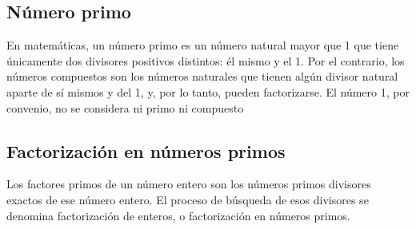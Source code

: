 \subsection{Número primo}
En matemáticas, un número primo es un número natural mayor que 1 que tiene únicamente
dos divisores positivos distintos: él mismo y el 1. Por el contrario, los números compuestos son
los números naturales que tienen algún divisor natural aparte de sí mismos y del 1, y, por lo tanto, pueden factorizarse. El número 1, por convenio, no se considera ni primo ni compuesto

\subsection{Factorización en números primos}
Los factores primos de un número entero son los números primos divisores exactos de ese número entero. El proceso de búsqueda de esos divisores se denomina factorización de enteros, o factorización en números primos.